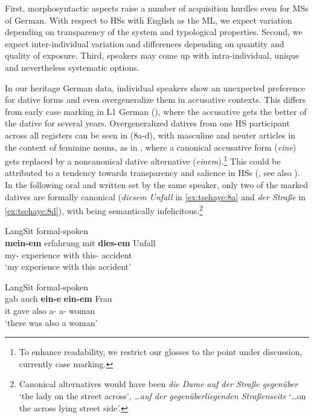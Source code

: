 \documentclass[output=paper]{langscibook}
\begin{document}
First, morphosyntactic aspects raise a number of acquisition hurdles even for MSs of German. With respect to HSs with English as the ML, we expect variation depending on transparency of the system and typological properties. Second, we expect inter-individual variation and differences depending on quantity and quality of exposure. Third, speakers may come up with intra-individual, unique and nevertheless systematic options.\largerpage[1.5]

In our heritage German data, individual speakers show an unexpected preference for dative forms and even overgeneralize them in accusative contexts. This differs from early case marking in L1 German (\citealt{Clahsen1984, Tracy1986}), where the accusative gets the better of the dative for several years. Overgeneralized datives from one HS participant across all registers can be seen in (8a-d), with masculine and neuter articles in the context of feminine nouns, as in , where a canonical accusative form (\textit{eine}) gets replaced by a noncanonical dative alternative (\textit{einem}).\footnote{To enhance readability, we restrict our glosses to the point under discussion, currently case marking.} This could be attributed to a tendency towards transparency and salience in HSs  (\cites[165]{Polinsky2018Bilingual}{Polinsky2018}, see also ). In the following oral and written set by the same speaker, only two of the marked datives are formally canonical (\textit{diesem Unfall} in \ref{ex:tsehaye:8a} and \textit{der Straße} in \ref{ex:tsehaye:8d}), with  being semantically infelicitous.\footnote{Canonical alternatives would have been \textit{die Dame auf der Straße gegenüber} ‘the lady on the street across’, \textit{…auf der gegenüberliegenden Straßenseite} ‘…on the across lying street side’.}

\ea\label{ex:tsehaye:8}%
\ea LangSit formal-spoken \label{ex:tsehaye:8a}\\
\gll \textbf{{mein-em}} {erfahrung} {mit} \textbf{{dies-em}} {Unfall}\\
	 my-\Dat{} experience with this-\Dat{} accident\\
\glt ‘my experience with this accident’

\ex LangSit formal-spoken\label{ex:tsehaye:8b}\\
 {gab} {auch} \textbf{{ein-e}} \textbf{{ein-em}} {Frau}\\
	 it gave also {a}-\Acc{} {a}-\Dat{} woman\\
\glt ‘there was also a woman’
\end{document}
